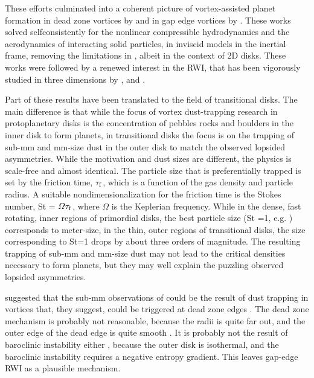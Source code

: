 \documentclass[apj]{emulateapj}
\begin{document}
These efforts culminated into a coherent picture of vortex-assisted
planet formation in dead zone vortices by \citet{Lyra08,Lyra09a} and in 
gap edge vortices by \citet{Lyra09b}. These works solved
selfconsistently for the nonlinear compressible hydrodynamics and the
aerodynamics of interacting solid particles, in inviscid models in the
inertial frame, removing the limitations in \citet{Johansen04},
albeit in the context of 2D disks. These works were followed by a renewed
interest in the RWI, that has been vigorously studied in three
dimensions by \citet{Meheut10,Meheut12a,Meheut12b,Meheut12c,Lin-Papaloizou11a,Lin-Papaloizou11b,Lin-Papaloizou12,Lin12,Lin13}, and \citet{Lyra-MacLow12}. 

Part of these results have been translated to the field of
transitional disks. The main difference is that while the focus 
of vortex dust-trapping research in protoplanetary disks is the
concentration of pebbles rocks and boulders in the inner disk to form
planets, in transitional disks the focus is on the trapping of sub-mm
and mm-size dust in the outer disk to match the observed lopsided 
asymmetries. While the motivation and dust sizes are different, the
physics is scale-free and almost identical. The particle size that is
preferentially trapped is set by the friction time, $\tau_{\rm f}$, which is a
function of the gas density and particle radius. A suitable nondimensionalization for the
friction time is the Stokes number, St = $\varOmega \tau_{\rm f}$,
where $\varOmega$ is the Keplerian frequency. While in the dense, fast
rotating, inner regions of primordial disks, the best particle size (St =1, e.g. 
\citealt{Youdin-Goodman05,Youdin08}) corresponds to meter-size, in the thin, outer regions of transitional
disks, the size corresponding to St=1 drops by about three orders of
magnitude. The resulting trapping of sub-mm and mm-size dust may not
lead to the critical densities necessary to form planets, but they may
well explain the puzzling observed lopsided asymmetries. 

\citet{Regaly12} suggested that the sub-mm 
observations of \citet{Brown09} could be the result of dust
trapping in vortices that, they suggest, could be triggered at dead
zone edges \citep{Varniere-Tagger06,Inaba-Barge06,Lyra08,Lyra09a}. The dead zone mechanism is probably not reasonable,
because the radii is quite far out, and the outer edge of the dead
edge is quite smooth \citep{Dzyurkevich13,Landry13}. It is probably
not the result of baroclinic instability either
\citep{Klahr-Bodenheimer03,Lesur-Papaloizou10,Lyra-Klahr11,Raettig13}, 
because the outer disk is isothermal, and the baroclinic instability requires a negative
entropy gradient. This leaves gap-edge RWI as a plausible mechanism. 
\end{document}
